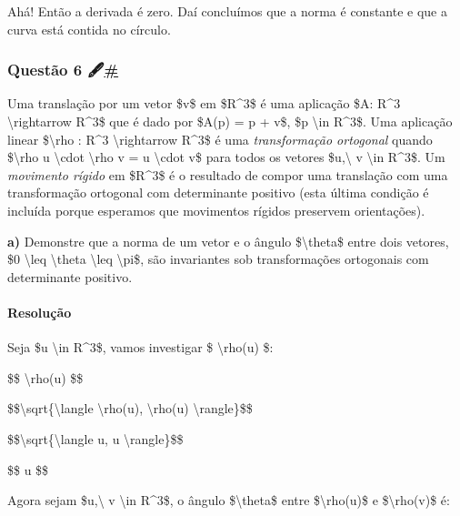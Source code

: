Ahá! Então a derivada é zero. Daí concluímos que a norma é constante e
que a curva está contida no círculo.

\hypertarget{questuxe3o-6-}{%
\subsubsection{\texorpdfstring{Questão 6
🖋️\protect\hyperlink{questuxe3o-6-}{\#}}{Questão 6 🖋️\#}}\label{questuxe3o-6-}}

Uma translação por um vetor \$v\$ em \$R\^{}3\$ é uma aplicação \$A:
R\^{}3 \textbackslash{}rightarrow R\^{}3\$ que é dado por \$A(p) = p +
v\$, \$p \textbackslash{}in R\^{}3\$. Uma aplicação linear
\$\textbackslash{}rho : R\^{}3 \textbackslash{}rightarrow R\^{}3\$ é uma
\emph{transformação ortogonal} quando \$\textbackslash{}rho u
\textbackslash{}cdot \textbackslash{}rho v = u \textbackslash{}cdot v\$
para todos os vetores \$u,\textbackslash{} v \textbackslash{}in
R\^{}3\$. Um \emph{movimento rígido} em \$R\^{}3\$ é o resultado de
compor uma translação com uma transformação ortogonal com determinante
positivo (esta última condição é incluída porque esperamos que
movimentos rígidos preservem orientações).

\textbf{a)} Demonstre que a norma de um vetor e o ângulo
\$\textbackslash{}theta\$ entre dois vetores, \$0 \textbackslash{}leq
\textbackslash{}theta \textbackslash{}leq \textbackslash{}pi\$, são
invariantes sob transformações ortogonais com determinante positivo.

\hypertarget{resoluuxe7uxe3o-5}{%
\paragraph{Resolução}\label{resoluuxe7uxe3o-5}}

Seja \$u \textbackslash{}in R\^{}3\$, vamos investigar \$\textbar{}
\textbackslash{}rho(u) \textbar{}\$:

\$\$\textbar{} \textbackslash{}rho(u) \textbar{}\$\$

\$\$\textbackslash{}sqrt\{\textbackslash{}langle \textbackslash{}rho(u),
\textbackslash{}rho(u) \textbackslash{}rangle\}\$\$

\$\$\textbackslash{}sqrt\{\textbackslash{}langle u, u
\textbackslash{}rangle\}\$\$

\$\$\textbar{} u \textbar{}\$\$

Agora sejam \$u,\textbackslash{} v \textbackslash{}in R\^{}3\$, o ângulo
\$\textbackslash{}theta\$ entre \$\textbackslash{}rho(u)\$ e
\$\textbackslash{}rho(v)\$ é:

